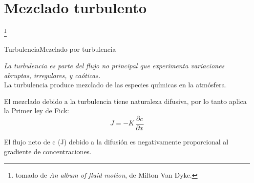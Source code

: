 \section{Mezclado turbulento}
\begin{frame}{}
 \footnote{tomado de \textit{An album of fluid motion}, de Milton Van Dyke.}
\end{frame}

\begin{frame}{Turbulencia}{Mezclado por turbulencia}

\textit{La turbulencia es parte del flujo no principal que experimenta variaciones abruptas, irregulares, y caóticas.}\\[0.5em]

La turbulencia produce mezclado de las especies químicas en la atmósfera.\\[0.5em]
\pause

 El mezclado debido a la turbulencia tiene naturaleza difusiva, por lo tanto aplica la \alert{Primer ley de Fick:}
 $$\boxed{J=-K\,\dfrac{\partial c }{\partial x} }$$
\pause


El flujo neto de c  (J) debido a la difusión es negativamente proporcional al gradiente de concentraciones.
\end{frame}



